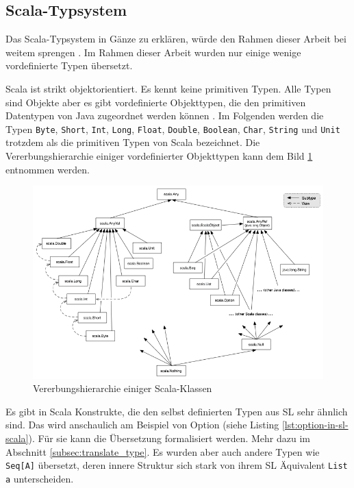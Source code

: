 \documentclass[12pt,bibtotoc]{scrreprt}
\begin{document}
\subsection{Scala-Typsystem}

Das Scala-Typsystem in Gänze zu erklären, würde den Rahmen dieser Arbeit bei weitem sprengen \cite{Odersky2013}. Im Rahmen dieser Arbeit wurden nur einige wenige vordefinierte Typen übersetzt.

Scala ist strikt objektorientiert. Es kennt keine primitiven Typen. Alle Typen sind Objekte aber es gibt vordefinierte Objekttypen, die den primitiven Datentypen von Java zugeordnet werden können \cite{Paggen2013}. Im Folgenden werden die Typen \lstinline!Byte!, \lstinline!Short!, \lstinline!Int!, \lstinline!Long!, \lstinline!Float!, \lstinline!Double!, \lstinline!Boolean!, \lstinline!Char!, \lstinline!String! und \lstinline!Unit! trotzdem als die primitiven Typen von Scala bezeichnet. Die Vererbungshierarchie einiger vordefinierter Objekttypen kann dem Bild \ref{fig:classhierarchy} entnommen werden.

\begin{figure}[h] 
  \centering
     \includegraphics[width=\textwidth]{Bilder/classhierarchy}
  \caption{Vererbungshierarchie einiger Scala-Klassen \cite{UnbekannterAutor2013}}
  \label{fig:classhierarchy}
\end{figure}

Es gibt in Scala Konstrukte, die den selbst definierten Typen aus \ac{SL} sehr ähnlich sind. Das wird anschaulich am Beispiel von Option (siehe Listing \ref{lst:option-in-sl-scala}). Für sie kann die Übersetzung formalisiert werden. Mehr dazu im Abschnitt \ref{subsec:translate_type}. Es wurden aber auch andere Typen wie \lstinline!Seq[A]! übersetzt, deren innere Struktur sich stark von ihrem SL Äquivalent \lstinline!List a! unterscheiden.
\end{document}
